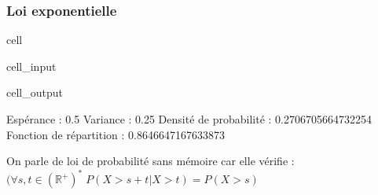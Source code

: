 \documentclass[letterpaper,10pt,english]{jupyterBook}
\begin{document}
\subsubsection{Loi exponentielle}
\label{\detokenize{elemstats:loi-exponentielle}}
\begin{sphinxuseclass}{cell}\begin{sphinxVerbatimInput}

\begin{sphinxuseclass}{cell_input}
\begin{sphinxVerbatim}[commandchars=\\\{\}]
   

   
   
   

 
 
    
    
\end{sphinxVerbatim}

\end{sphinxuseclass}\end{sphinxVerbatimInput}
\begin{sphinxVerbatimOutput}

\begin{sphinxuseclass}{cell_output}
\begin{sphinxVerbatim}[commandchars=\\\{\}]
Espérance :  0.5
Variance :  0.25
Densité de probabilité :  0.2706705664732254
Fonction de répartition :  0.8646647167633873
\end{sphinxVerbatim}

\end{sphinxuseclass}\end{sphinxVerbatimOutput}

\end{sphinxuseclass}
\sphinxAtStartPar
On parle de loi de probabilité sans mémoire car elle vérifie :
\( (\forall s,t\in(\mathbb{R}^+)^*\; P(X>s+t |X>t) = P(X>s)\)
\end{document}
